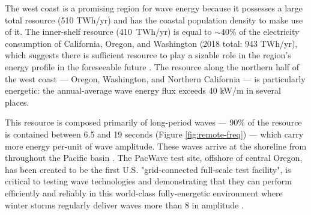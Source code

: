 The west coast is a promising region for wave energy because it possesses a large total resource (510 TWh/yr\DIFdelbegin {}\DIFdelend ) and has the coastal population density to make use of it. The inner-shelf resource (410~TWh/yr) is equal to $\sim40$\% of the electricity consumption of California, Oregon, and Washington (2018 total: 943 TWh/yr), which suggests \DIFdelbegin {}\DIFdelend there is sufficient resource to play a sizable role in the region's energy profile in the foreseeable future \citep{energyinformationadministrationStateEnergyConsumption2020}. The resource along the northern half of the west coast — Oregon, Washington, and Northern California — is particularly energetic: the annual-average wave energy flux exceeds 40 kW/m in several places.
\DIFdelbegin {}%

{%
}
\DIFdelend 

This resource is composed primarily of long-period waves — 90\% of the resource is contained between 6.5 and 19 seconds (Figure \ref{fig:remote-freq}) — which carry more energy per-unit of wave amplitude. These waves arrive at the shoreline from throughout the Pacific basin \citep{perezESTELAMethodEvaluating2014}. The PacWave test site, offshore of central Oregon, has been created to be the first U.S. "grid-connected full-scale test facility", is critical to testing wave technologies and demonstrating that they can perform efficiently and reliably in this world-class fully-energetic environment where winter storms regularly deliver waves \DIFdelbegin {}\DIFdelend more than 8 \DIFdelbegin {}\DIFdelend \DIFaddbegin {}\DIFaddend in amplitude \citep[e.g.][]{allan_climate_2006}.


\DIFdelbegin %
{%
}

